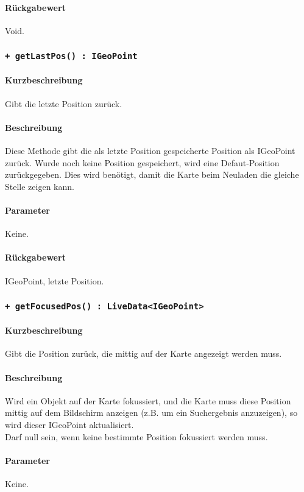 \paragraph*{Rückgabewert}
Void.

\subsubsection{\texttt{+ getLastPos() : IGeoPoint}}%
\paragraph*{Kurzbeschreibung}
Gibt die letzte Position zurück.
\paragraph*{Beschreibung}
Diese Methode gibt die als letzte Position gespeicherte Position als IGeoPoint zurück.
Wurde noch keine Position gespeichert, wird eine Defaut-Position zurückgegeben.
Dies wird benötigt, damit die Karte beim Neuladen die gleiche Stelle zeigen kann.
\paragraph*{Parameter}
Keine.
\paragraph*{Rückgabewert}
IGeoPoint, letzte Position.

\subsubsection{\texttt{+ getFocusedPos() : LiveData<IGeoPoint>}}%
\paragraph*{Kurzbeschreibung}
Gibt die Position zurück, die mittig auf der Karte angezeigt werden muss.
\paragraph*{Beschreibung}
Wird ein Objekt auf der Karte fokussiert, und die Karte muss diese Position mittig auf dem 
Bildschirm anzeigen (z.B. um ein Suchergebnis anzuzeigen), so wird dieser IGeoPoint aktualisiert.\\
Darf null sein, wenn keine bestimmte Position fokussiert werden muss.
\paragraph*{Parameter}
Keine.

